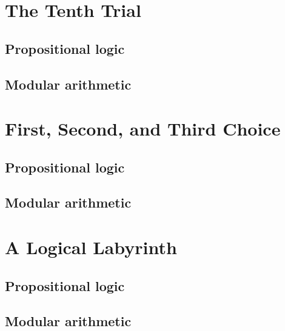 

\section{The Tenth Trial} 

\subsection{Propositional logic}

 
\subsection{Modular arithmetic}



\section{First, Second, and Third Choice} 

\subsection{Propositional logic}

 
\subsection{Modular arithmetic}



\section{A Logical Labyrinth} 

\subsection{Propositional logic}

 
\subsection{Modular arithmetic}

